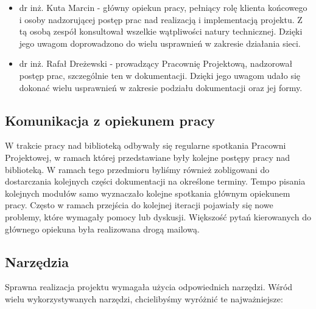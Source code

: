 \begin{itemize}
  \item dr inż. Kuta Marcin - główny opiekun pracy, pełniący rolę klienta końcowego i osoby nadzorującej
  postęp prac nad realizacją i implementacją projektu. Z tą osobą zespół konsultował wszelkie wątpliwości
  natury technicznej. Dzięki jego uwagom doprowadzono do wielu usprawnień w zakresie działania sieci.
  \item dr inż. Rafał Dreżewski - prowadzący Pracownię Projektową, nadzorował postęp prac, 
  szczególnie ten w dokumentacji. Dzięki jego uwagom udało się dokonać wielu usprawnień w zakresie podziału
  dokumentacji oraz jej formy.
\end{itemize}

\subsection{Komunikacja z opiekunem pracy}
W trakcie pracy nad biblioteką odbywały się regularne spotkania Pracowni Projektowej, w ramach której 
przedstawiane były kolejne postępy pracy nad biblioteką. W ramach tego przedmioru byliśmy również
zobligowani do dostarczania kolejnych części dokumentacji na określone terminy. Tempo pisania kolejnych modułów
samo wyznaczało kolejne spotkania głównym opiekunem pracy. Często w ramach przejścia do kolejnej iteracji
pojawiały się nowe problemy, które wymagały pomocy lub dyskusji. Większość pytań kierowanych do 
głównego opiekuna była realizowana drogą mailową. 

\subsection{Narzędzia}
Sprawna realizacja projektu wymagała użycia odpowiednich narzędzi. Wśród wielu wykorzystywanych narzędzi,
chcielibyśmy wyróżnić te najważniejsze:

